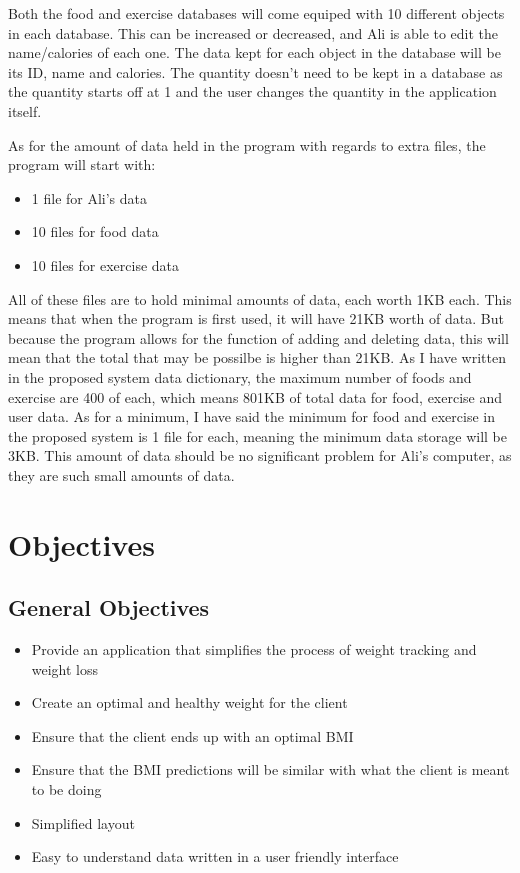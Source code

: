 Both the food and exercise databases will come equiped with 10 different objects in each database. This can be increased or decreased, and Ali is able to edit the name/calories of each one. The data kept for each object in the database will be its ID, name and calories. The quantity doesn't need to be kept in a database as the quantity starts off at 1 and the user changes the quantity in the application itself.

As for the amount of data held in the program with regards to extra files, the program will start with:

\begin{itemize}
\item 1 file for Ali's data
\item 10 files for food data
\item 10 files for exercise data
\end{itemize}

All of these files are to hold minimal amounts of data, each worth 1KB each. This means that when the program is first used, it will have 21KB worth of data. But because the program allows for the function of adding and deleting data, this will mean that the total that may be possilbe is higher than 21KB. As I have written in the proposed system data dictionary, the maximum number of foods and exercise are 400 of each, which means 801KB of total data for food, exercise and user data. As for a minimum, I have said the minimum for food and exercise in the proposed system is 1 file for each, meaning the minimum data storage will be 3KB. This amount of data should be no significant problem for Ali's computer, as they are such small amounts of data.

\section{Objectives}

\subsection{General Objectives}

\begin{itemize}
\item Provide an application that simplifies the process of weight tracking and weight loss
\item Create an optimal and healthy weight for the client
\item Ensure that the client ends up with an optimal BMI
\item Ensure that the BMI predictions will be similar with what the client is meant to be doing
\item Simplified layout
\item Easy to understand data written in a user friendly interface
\end{itemize}

